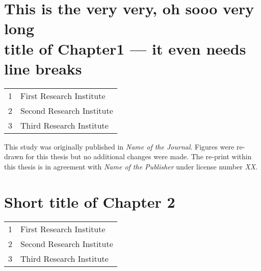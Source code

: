 
\chapter[This is the very very, oh sooo very long title of Chapter 1 --- it even needs line breaks]{\centering This is the very very, oh sooo very long\\ title of Chapter1 --- it even needs line breaks}
\vfill


\noindent\begin{tabular}{L{.015\textwidth}L{.985\textwidth}}
    1 & First Research Institute \\
    2 & Second Research Institute \\
    3 & Third Research Institute
\end{tabular}

\noindent\colorbox{clrt1!15}{\parbox{\textwidth}{
This study was originally published in \textit{Name of the Journal}.
Figures were re-drawn for this thesis but no additional changes were made.
The re-print within this thesis is in agreement with \textit{Name of the Publisher} under license number \textit{XX}.

}}

\noindent

\chapter[Short title of Chapter 2]{\centering Short title of Chapter 2\\}


\noindent\begin{tabular}{L{.015\textwidth}L{.985\textwidth}}
    1 & First Research Institute \\
    2 & Second Research Institute \\
    3 & Third Research Institute
\end{tabular}

